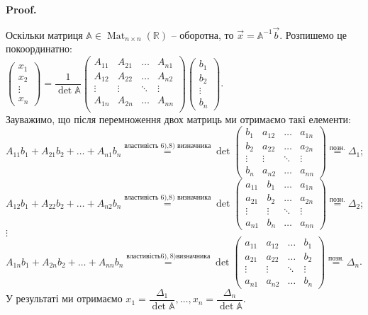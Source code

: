 \documentclass[a4paper, 10pt]{article}
\makeatletter
\theoremstyle{theoremdd}
\DeclareMathOperator{\Mat}{Mat}
\renewenvironment{proof}[1][Proof.\\]{\par
\pushQED{\hfill \qed}%
\normalfont \topsep6\p@\@plus6\p@\relax
\trivlist
\item\relax
{\bfseries
#1\@addpunct{.}}\hspace\labelsep\ignorespaces
}{%
\popQED\endtrivlist\@endpefalse
}
\makeatother
\begin{document}
\begin{proof}
Оскільки матриця $\mathbb{A} \in \Mat_{n \times n}(\mathbb{R})$ -- оборотна, то $\vec{x} = \mathbb{A}^{-1} \vec{b}$. Розпишемо це покоординатно:\\
$\begin{pmatrix}
x_1 \\ x_2 \\ \vdots \\ x_n
\end{pmatrix} = \dfrac{1}{\det \mathbb{A}} \begin{pmatrix}
A_{11} & A_{21} & \dots & A_{n1} \\
A_{12} & A_{22} & \dots & A_{n2} \\
\vdots & \vdots & \ddots & \vdots \\
A_{1n} & A_{2n} & \dots & A_{nn} \\
\end{pmatrix} \begin{pmatrix}
b_1 \\ b_2 \\ \vdots \\ b_n
\end{pmatrix}$.\\
Зауважимо, що після перемноження двох матриць ми отримаємо такі елементи:\\
$A_{11}b_1 + A_{21}b_2 + \dots + A_{n1}b_n \overset{\textrm{властивість 6),8) визначника}}{=} \det \begin{pmatrix}
b_1  & a_{12} & \dots & a_{1n} \\
b_2 & a_{22} & \dots & a_{2n} \\
\vdots & \vdots & \ddots & \vdots \\
b_n & a_{n2} & \dots & a_{nn}
\end{pmatrix} \overset{\text{позн.}}{=} \Delta_1$;\\
$A_{12}b_1 + A_{22}b_2 + \dots + A_{n2}b_n \overset{\textrm{властивість 6),8) визначника}}{=} \det \begin{pmatrix}
a_{11}  & b_1 & \dots & a_{1n} \\
a_{21} & b_2 & \dots & a_{2n} \\
\vdots & \vdots & \ddots & \vdots \\
a_{n1} & b_n & \dots & a_{nn}
\end{pmatrix} \overset{\text{позн.}}{=} \Delta_2$;\\
$\vdots$\\
$A_{1n}b_1 + A_{2n}b_2 + \dots + A_{nn}b_n \overset{властивість 6),8) визначника}{=} \det \begin{pmatrix}
a_{11}  & a_{12} & \dots & b_1 \\
a_{21} & a_{22} & \dots & b_2 \\
\vdots & \vdots & \ddots & \vdots \\
a_{n1} & a_{n2} & \dots & b_n
\end{pmatrix} \overset{\text{позн.}}{=} \Delta_n$.\\
У результаті ми отримаємо $x_1 = \dfrac{\Delta_1}{\det \mathbb{A}},\dots, x_n = \dfrac{\Delta_n}{\det \mathbb{A}}$.
\end{proof}
\end{document}
